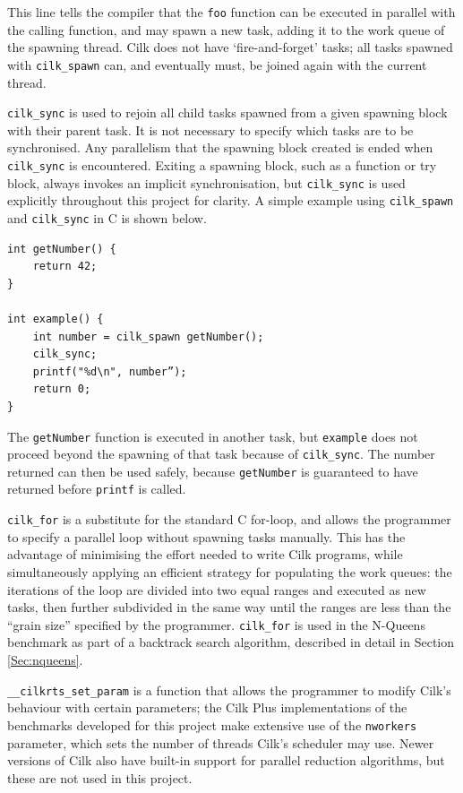 \documentclass{report}
\newenvironment{mono}{\fontfamily{ttfamily}\selectfont}{\par}
\newenvironment{embedcode}{\begin{changemargin}{6em}{3em}\begin{mono}{}}{\end{mono}\end{changemargin}}
\begin{document}
This line tells the compiler that the \verb!foo! function can be executed in parallel with the calling function, and may spawn a new task, adding it to the work queue of the spawning thread\cite{Jeffers13}. Cilk does not have `fire-and-forget' tasks; all tasks spawned with \verb!cilk_spawn! can, and eventually must, be joined again with the current thread\cite{Jeffers13}.

\verb!cilk_sync! is used to rejoin all child tasks spawned from a given spawning block with their parent task\cite{Jeffers13}. It is not necessary to specify which tasks are to be synchronised. Any parallelism that the spawning block created is ended when \verb!cilk_sync! is encountered. Exiting a spawning block, such as a function or try block, always invokes an implicit synchronisation, but \verb!cilk_sync! is used explicitly throughout this project for clarity. A simple example using \verb!cilk_spawn! and \verb!cilk_sync! in C is shown below.

\begin{embedcode}
\begin{verbatim}
int getNumber() {
    return 42;
}

int example() {
    int number = cilk_spawn getNumber();
    cilk_sync;
    printf("%d\n", number”);
    return 0;
}
\end{verbatim}
\end{embedcode}

The \verb!getNumber! function is executed in another task, but \verb!example! does not proceed beyond the spawning of that task because of \verb!cilk_sync!. The number returned can then be used safely, because \verb!getNumber! is guaranteed to have returned before \verb!printf! is called.

\verb!cilk_for! is a substitute for the standard C for-loop, and allows the programmer to specify a parallel loop without spawning tasks manually. This has the advantage of minimising the effort needed to write Cilk programs, while simultaneously applying an efficient strategy for populating the work queues: the iterations of the loop are divided into two equal ranges and executed as new tasks, then further subdivided in the same way until the ranges are less than the “grain size” specified by the programmer\cite{cilkplussite}. \verb!cilk_for! is used in the N-Queens benchmark as part of a backtrack search algorithm, described in detail in Section \ref{Sec:nqueens}.

\verb!__cilkrts_set_param! is a function that allows the programmer to modify Cilk's behaviour with certain parameters; the Cilk Plus implementations of the benchmarks developed for this project make extensive use of the \verb!nworkers! parameter, which sets the number of threads Cilk's scheduler may use. Newer versions of Cilk also have built-in support for parallel reduction algorithms, but these are not used in this project.
\end{document}
